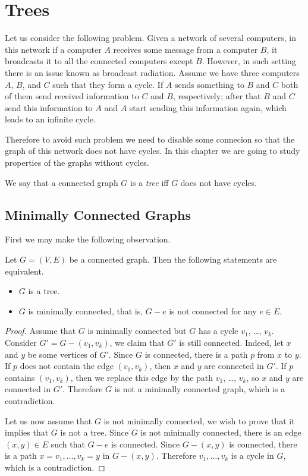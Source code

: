 \chapter{Trees}
Let us consider the following problem. Given a network of several computers,
in this network if a computer $A$ receives some message from a computer $B$,
it broadcasts it to all the connected computers except $B$.
However, in such setting there is an issue known as broadcast radiation.
Assume we have three computers $A$, $B$, and $C$ such that they form a cycle.
If $A$ sends something to $B$ and $C$ both of them send received information to
$C$ and $B$, respectively; after that $B$ and $C$ send this information to $A$
and $A$ start sending this information again, which leads to an infinite cycle.

Therefore to avoid such problem we need to disable some connecion so that the
graph of this network does not have cycles.
In this chapter we are going to study properties of the graphs without cycles.
\begin{definition}
  We say that a connected graph $G$ is a \emph{tree} iff $G$ does not have cycles.
\end{definition}

\section{Minimally Connected Graphs}
First we may make the following observation.
\begin{theorem}
  Let $G = (V, E)$ be a connected graph. Then the following statements are
  equivalent.
  \begin{itemize}
    \item $G$ is a tree.
    \item $G$ is minimally connected, that is, $G - e$ is not connected for any
      $e \in E$.
  \end{itemize}
\end{theorem}
\begin{proof}
  Assume that $G$ is minimally connected but $G$ has a cycle
  $v_1$, \dots, $v_k$. Consider $G' = G - (v_1, v_k)$, we claim that $G'$
  is still connected. Indeed, let $x$ and $y$ be some vertices of $G'$.
  Since $G$ is connected, there is a path $p$ from $x$ to $y$. If $p$ does not
  contain the edge $(v_1, v_k)$, then $x$ and $y$ are connected in $G'$. If
  $p$ contains $(v_1, v_k)$, then we replace this edge by the path $v_1$, \dots,
  $v_k$, so $x$ and $y$ are connected in $G'$. Therefore $G$ is not a minimally
  connected graph, which is a contradiction.

  Let us now assume that $G$ is not minimally connected, we wish to prove that
  it implies that $G$ is not a tree. Since $G$ is not minimally connected, there
  is an edge $(x, y) \in E$ such that $G - e$ is connected. Since $G - (x, y)$
  is connected, there is a path $x = v_1, \dots, v_k = y$ in $G - (x, y)$.
  Therefore $v_1, \dots, v_k$ is a cycle in $G$, which is a contradiction.
 \end{proof}

